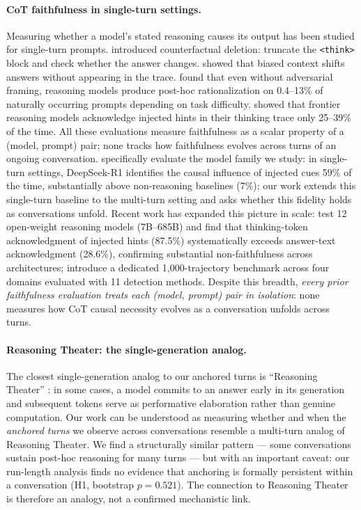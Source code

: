 \documentclass{article}
\begin{document}
\paragraph{CoT faithfulness in single-turn settings.}
Measuring whether a model's stated reasoning causes its output
has been studied for single-turn prompts.
\citet{lanham2023} introduced counterfactual deletion: truncate the
\texttt{<think>} block and check whether the answer changes.
\citet{turpin2023} showed that biased context shifts answers without
appearing in the trace.
\citet{arcuschin2025} found that even without adversarial framing,
reasoning models produce post-hoc rationalization on 0.4--13\% of
naturally occurring prompts depending on task difficulty.
\citet{chen2025} showed that frontier reasoning models acknowledge
injected hints in their thinking trace only 25--39\% of the time.
All these evaluations measure faithfulness as a scalar property of
a (model, prompt) pair; none tracks how faithfulness evolves across
turns of an ongoing conversation.
\citet{chua2025} specifically evaluate the model family we study:
in single-turn settings, DeepSeek-R1 identifies the causal influence
of injected cues 59\% of the time, substantially above
non-reasoning baselines (7\%); our work extends this single-turn
baseline to the multi-turn setting and asks whether this fidelity
holds as conversations unfold.
Recent work has expanded this picture in scale:
\citet{lieto2026} test 12 open-weight reasoning models (7B--685B)
and find that thinking-token acknowledgment of injected hints (87.5\%)
systematically exceeds answer-text acknowledgment (28.6\%),
confirming substantial non-faithfulness across architectures;
\citet{faithcotbench2026} introduce a dedicated 1{,}000-trajectory
benchmark across four domains evaluated with 11 detection methods.
Despite this breadth, \textit{every prior faithfulness evaluation
treats each (model, prompt) pair in isolation}: none measures how
CoT causal necessity evolves as a conversation unfolds across turns.

\paragraph{Reasoning Theater: the single-generation analog.}
The closest single-generation analog to our anchored turns is
``Reasoning Theater'' \citep{reasoning_theater2026}: in some
cases, a model commits to an answer early in its generation
and subsequent tokens serve as performative elaboration rather
than genuine computation.
Our work can be understood as measuring whether and when the
\emph{anchored turns} we observe across conversations resemble a
multi-turn analog of Reasoning Theater.
We find a structurally similar pattern --- some conversations
sustain post-hoc reasoning for many turns --- but with an important
caveat: our run-length analysis finds no evidence that anchoring
is formally persistent within a conversation (H1, bootstrap $p=0.521$).
The connection to Reasoning Theater is therefore an analogy, not
a confirmed mechanistic link.
\end{document}
